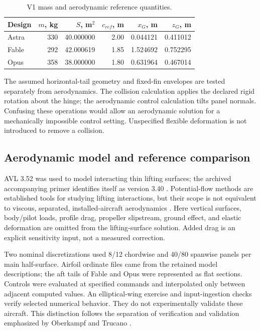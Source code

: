 \documentclass[11pt,a4paper]{article}
\begin{document}
\begin{table}[H]\centering\small
\caption{V1 mass and aerodynamic reference quantities.}\label{tab:refs}
\begin{tabular}{lrrrrr}\toprule
Design & $m$, kg & $S$, m$^2$ & $c_{ref}$, m & $x_G$, m & $z_G$, m\\\midrule
Astra &330&40.000000&2.00&0.044121&0.411012\\
Fable &292&42.000619&1.85&1.524692&0.752295\\
Opus &358&38.000000&1.80&0.631964&0.467014\\\bottomrule
\end{tabular}
\end{table}

The assumed horizontal-tail geometry and fixed-fin envelopes are tested separately from aerodynamics. The collision calculation applies the declared rigid rotation about the hinge; the aerodynamic control calculation tilts panel normals. Confusing these operations would allow an aerodynamic solution for a mechanically impossible control setting. Unspecified flexible deformation is not introduced to remove a collision.

\subsection{Aerodynamic model and reference comparison}
AVL 3.52 was used to model interacting thin lifting surfaces; the archived accompanying primer identifies itself as version 3.40 \cite{ref20}. Potential-flow methods are established tools for studying lifting interactions, but their scope is not equivalent to viscous, separated, installed-aircraft aerodynamics \cite{ref21,ref22}. Here vertical surfaces, body/pilot loads, profile drag, propeller slipstream, ground effect, and elastic deformation are omitted from the lifting-surface solution. Added drag is an explicit sensitivity input, not a measured correction.

Two nominal discretizations used 8/12 chordwise and 40/80 spanwise panels per main half-surface. Airfoil ordinate files came from the retained model descriptions; the aft tails of Fable and Opus were represented as flat sections. Controls were evaluated at specified commands and interpolated only between adjacent computed values. An elliptical-wing exercise and input-ingestion checks verify selected numerical behavior. They do not experimentally validate these aircraft. This distinction follows the separation of verification and validation emphasized by Oberkampf and Trucano \cite{ref24}.
\end{document}
